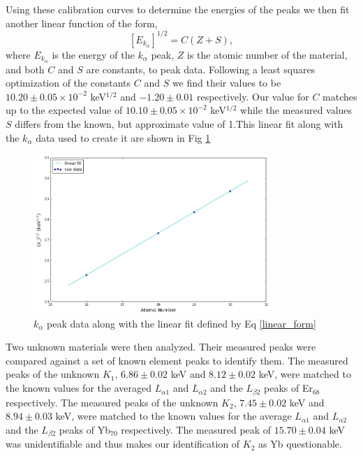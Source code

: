 \documentclass[prb,preprint]{revtex4-1}
\begin{document}
Using these calibration curves to determine the energies of the peaks we then fit another linear function of the form,
\begin{equation}\label{linear_form}
[E_{k_\alpha}]^{1/2}=C(Z+S),
\end{equation}
where $E_{k_\alpha}$ is the energy of the $k_{\alpha}$ peak, $Z$ is the atomic number of the material, and both $C$ and $S$ are constants, to peak data. Following a least squares optimization of the constants $C$ and $S$ we find their values to be $10.20\pm0.05\times10^{-2}$ keV$^{1/2}$ and $-1.20\pm0.01$ respectively. Our value for $C$ matches up to the expected value of $10.10\pm0.05\times10^{-2}$ keV$^{1/2}$ while the measured values $S$ differs from the known, but approximate value of 1.This linear fit along with the $k_\alpha$ data used to create it are shown in Fig \ref{atomic}

\begin{figure}[h]
\centering
\includegraphics[width=0.8\textwidth]{atomic.png}
\caption{$k_\alpha$ peak data along with the linear fit defined by Eq \eqref{linear_form}}
\label{atomic}
\end{figure}

Two unknown materials were then analyzed. Their measured peaks were compared against a set of known element peaks to identify them. The measured peaks of the unknown $K_1$, $6.86\pm0.02$ keV and $8.12\pm0.02$ keV, were matched to the known values for the averaged $L_{\alpha1}$ and $L_{\alpha2}$ and the $L_{\beta2}$ peaks of Er$_{68}$ respectively.  The measured peaks of the unknown $K_2$, $7.45\pm0.02$ keV and $8.94\pm0.03$ keV, were matched to the known values for the average $L_{\alpha1}$ and $L_{\alpha2}$ and the $L_{\beta2}$ peaks of Yb$_{70}$ respectively. The measured peak of $15.70\pm0.04$ keV was unidentifiable and thus makes our identification of $K_2$ as Yb questionable.
\end{document}
